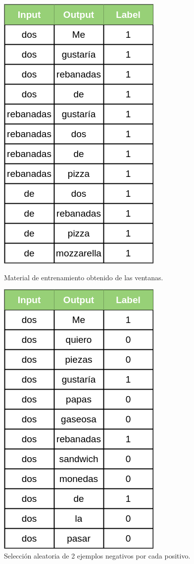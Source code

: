 \begin{figure}
    \centering
    \begin{minipage}[b]{0.4\textwidth}
      \includegraphics[scale=0.5]{figures/context_example_2.png}
      \caption{Material de entrenamiento obtenido de las ventanas.}
      \label{fig:wb_all_ones_matrix}
    \end{minipage}
    \hfill
    \begin{minipage}[b]{0.4\textwidth}
      \includegraphics[scale=0.5]{figures/context_example_3.png}
      \caption{Selección aleatoria de 2 ejemplos negativos por cada positivo.}
      \label{fig:wb_neg_sampling_matrix}
    \end{minipage}
\end{figure}

